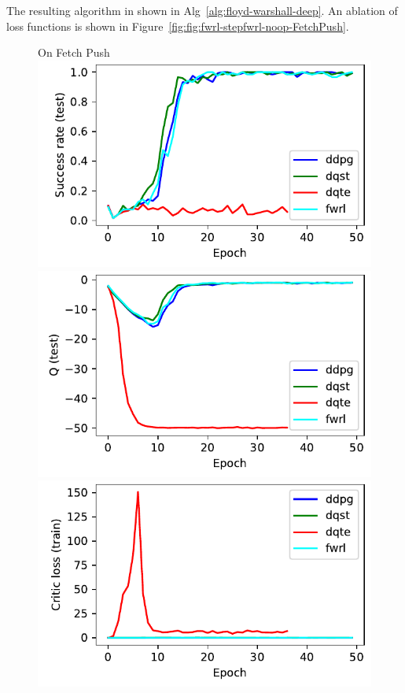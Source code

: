 The resulting algorithm in shown in Alg~\ref{alg:floyd-warshall-deep}. An
ablation of loss functions is shown in Figure~\ref{fig:fig:fwrl-stepfwrl-noop-FetchPush}.




%
\begin{figure}
  \def\frac{0.32}
  On Fetch Push\\
  \includegraphics[width=\frac\columnwidth]{media/res/38f4625-FetchPush-v1-fwrl-future/test/success_rate.pdf}%
  \includegraphics[width=\frac\columnwidth]{media/res/38f4625-FetchPush-v1-fwrl-future/test/mean_Q.pdf}%
  \includegraphics[width=\frac\columnwidth]{media/res/38f4625-FetchPush-v1-fwrl-future/train/critic_loss.pdf}\\

\end{figure}
